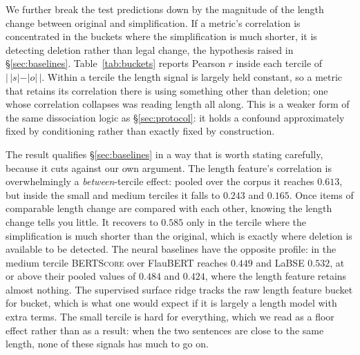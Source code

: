 \documentclass[11pt]{article}
\begin{document}
We further break the test predictions down by the magnitude of the length change
between original and simplification. If a metric's correlation is concentrated
in the buckets where the simplification is much shorter, it is detecting
deletion rather than legal change, the hypothesis raised in
\S\ref{sec:baselines}. Table~\ref{tab:buckets} reports Pearson $r$ inside each
tercile of $|\,|s|-|o|\,|$. Within a tercile the length signal is largely held
constant, so a metric that retains its correlation there is using something
other than deletion; one whose correlation collapses was reading length all
along. This is a weaker form of the same dissociation logic as
\S\ref{sec:protocol}: it holds a confound approximately fixed by conditioning
rather than exactly fixed by construction.

\begin{table}[t]\centering\small
\resizebox{\columnwidth}{!}{}
\caption{Correlation with the human label \emph{within} terciles of the
absolute length change, pooling test predictions over seeds. Restricting to a
tercile removes most of the length variance; a metric that measures legal
meaning should degrade far less than one that measures deletion.}
\label{tab:buckets}
\end{table}

The result qualifies \S\ref{sec:baselines} in a way that is worth stating
carefully, because it cuts against our own argument. The length feature's
correlation is overwhelmingly a \emph{between}-tercile effect: pooled over the
corpus it reaches $0.613$, but inside the small and medium terciles it falls to
$0.243$ and $0.165$. Once items of comparable length change are compared with
each other, knowing the length change tells you little. It recovers to $0.585$
only in the tercile where the simplification is much shorter than the original,
which is exactly where deletion is available to be detected. The neural
baselines have the opposite profile: in the medium tercile \textsc{BERTScore}
over FlauBERT reaches $0.449$ and LaBSE $0.532$, at or above their pooled values
of $0.484$ and $0.424$, where the length feature retains almost nothing. The
supervised surface ridge tracks the raw length feature bucket for bucket, which
is what one would expect if it is largely a length model with extra terms. The
small tercile is hard for everything, which we read as a floor effect rather
than as a result: when the two sentences are close to the same length, none of
these signals has much to go on.
\end{document}
